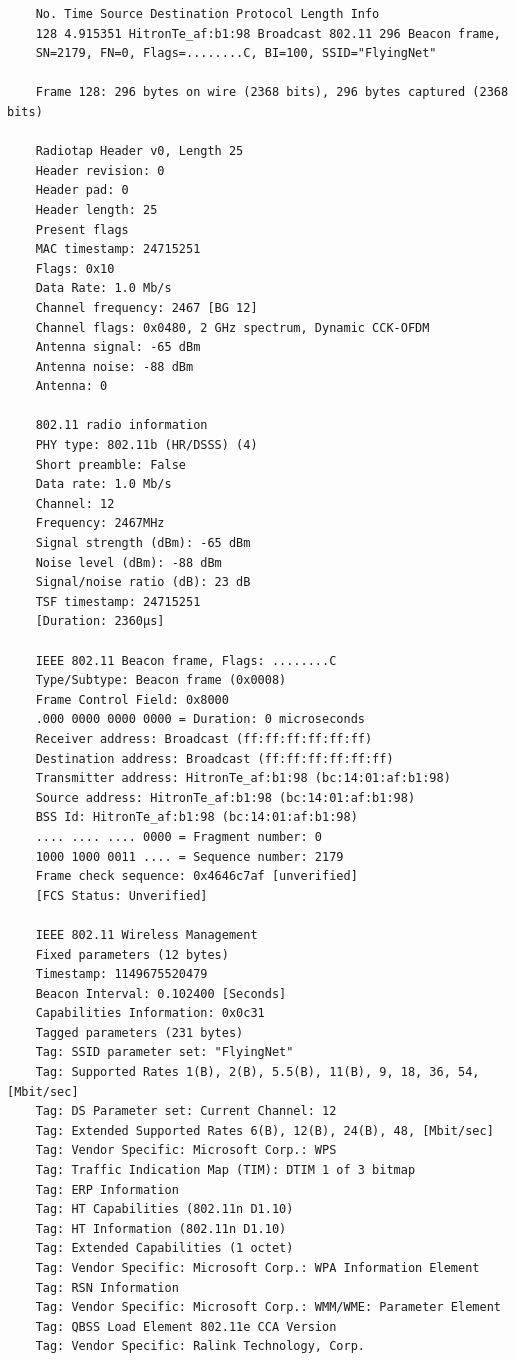\begin{verbatim}
    No. Time Source Destination Protocol Length Info
    128 4.915351 HitronTe_af:b1:98 Broadcast 802.11 296 Beacon frame,
    SN=2179, FN=0, Flags=........C, BI=100, SSID="FlyingNet"

    Frame 128: 296 bytes on wire (2368 bits), 296 bytes captured (2368 bits)

    Radiotap Header v0, Length 25
    Header revision: 0
    Header pad: 0
    Header length: 25
    Present flags
    MAC timestamp: 24715251
    Flags: 0x10
    Data Rate: 1.0 Mb/s
    Channel frequency: 2467 [BG 12]
    Channel flags: 0x0480, 2 GHz spectrum, Dynamic CCK-OFDM
    Antenna signal: -65 dBm
    Antenna noise: -88 dBm
    Antenna: 0

    802.11 radio information
    PHY type: 802.11b (HR/DSSS) (4)
    Short preamble: False
    Data rate: 1.0 Mb/s
    Channel: 12
    Frequency: 2467MHz
    Signal strength (dBm): -65 dBm
    Noise level (dBm): -88 dBm
    Signal/noise ratio (dB): 23 dB
    TSF timestamp: 24715251
    [Duration: 2360µs]

    IEEE 802.11 Beacon frame, Flags: ........C
    Type/Subtype: Beacon frame (0x0008)
    Frame Control Field: 0x8000
    .000 0000 0000 0000 = Duration: 0 microseconds
    Receiver address: Broadcast (ff:ff:ff:ff:ff:ff)
    Destination address: Broadcast (ff:ff:ff:ff:ff:ff)
    Transmitter address: HitronTe_af:b1:98 (bc:14:01:af:b1:98)
    Source address: HitronTe_af:b1:98 (bc:14:01:af:b1:98)
    BSS Id: HitronTe_af:b1:98 (bc:14:01:af:b1:98)
    .... .... .... 0000 = Fragment number: 0
    1000 1000 0011 .... = Sequence number: 2179
    Frame check sequence: 0x4646c7af [unverified]
    [FCS Status: Unverified]

    IEEE 802.11 Wireless Management
    Fixed parameters (12 bytes)
    Timestamp: 1149675520479
    Beacon Interval: 0.102400 [Seconds]
    Capabilities Information: 0x0c31
    Tagged parameters (231 bytes)
    Tag: SSID parameter set: "FlyingNet"
    Tag: Supported Rates 1(B), 2(B), 5.5(B), 11(B), 9, 18, 36, 54, [Mbit/sec]
    Tag: DS Parameter set: Current Channel: 12
    Tag: Extended Supported Rates 6(B), 12(B), 24(B), 48, [Mbit/sec]
    Tag: Vendor Specific: Microsoft Corp.: WPS
    Tag: Traffic Indication Map (TIM): DTIM 1 of 3 bitmap
    Tag: ERP Information
    Tag: HT Capabilities (802.11n D1.10)
    Tag: HT Information (802.11n D1.10)
    Tag: Extended Capabilities (1 octet)
    Tag: Vendor Specific: Microsoft Corp.: WPA Information Element
    Tag: RSN Information
    Tag: Vendor Specific: Microsoft Corp.: WMM/WME: Parameter Element
    Tag: QBSS Load Element 802.11e CCA Version
    Tag: Vendor Specific: Ralink Technology, Corp.
\end{verbatim}

